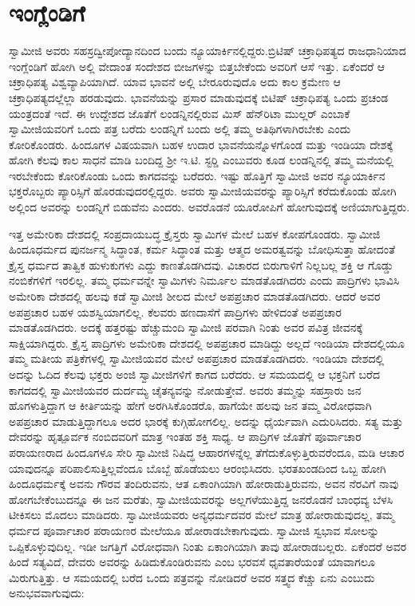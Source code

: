 
\chapter{ಇಂಗ್ಲೆಂಡಿಗೆ}

 ಸ್ವಾಮೀಜಿ ಅವರು ಸಹಸ್ರದ್ವೀಪೋದ್ಯಾನದಿಂದ ಬಂದು ನ್ಯೂಯಾರ್ಕಿನಲ್ಲಿದ್ದರು.\break ಬ್ರಿಟಿಷ್ ಚಕ್ರಾಧಿಪತ್ಯದ ರಾಜಧಾನಿಯಾದ ಇಂಗ್ಲೆಂಡಿಗೆ ಹೋಗಿ ಅಲ್ಲಿ ವೇದಾಂತ ಸಂದೇಶದ ಬೀಜಗಳನ್ನು ಬಿತ್ತಬೇಕೆಂದು ಅವರಿಗೆ ಆಸೆ ಇತ್ತು. ಏಕೆಂದರೆ ಆ ಚಕ್ರಾಧಿಪತ್ಯ ವಿಶ್ವವ್ಯಾಪಿಯಾಗಿದೆ. ಯಾವ ಭಾವನೆ ಅಲ್ಲಿ ಬೇರೂರುವುದೊ ಅದು ಕಾಲ ಕ್ರಮೇಣ ಆ ಚಕ್ರಾಧಿಪತ್ಯದಲ್ಲೆಲ್ಲಾ ಹರಡುವುದು. ಭಾವನೆಯನ್ನು ಪ್ರಸಾರ ಮಾಡುವುದಕ್ಕೆ ಬಿಟಿಷ್ ಚಕ್ರಾಧಿಪತ್ಯ ಒಂದು ಪ್ರಚಂಡ ಯಂತ್ರದಂತೆ ಇದೆ. ಈ ಉದ್ದೇಶದ ಜೊತೆಗೆ ಲಂಡನ್ನಿನಲ್ಲಿರುವ ಮಿಸ್ ಹೆನ್‍ರಿಟಾ ಮುಲ್ಲರ್ ಎಂಬಾಕೆ ಸ್ವಾಮೀಜಿಯವರಿಗೆ ಒಂದು ಪತ್ರ ಬರೆದು ಲಂಡನ್ನಿಗೆ ಬಂದು ಅಲ್ಲಿ ತಮ್ಮ ಅತಿಥಿಗಳಾಗಿರಬೇಕು ಎಂದು ಕೋರಿಕೊಂಡರು. ಹಿಂದೂಗಳ ವಿಷಯವಾಗಿ ಬಹಳ ಉದಾರ ಭಾವನೆಯನ್ನೊಳಗೊಂಡ ಮತ್ತು ಇಂಡಿಯಾ ದೇಶಕ್ಕೆ ಹೋಗಿ ಕೆಲವು ಕಾಲ ಸಾಧನೆ ಮಾಡಿ ಬಂದಿದ್ದ ಶ‍್ರೀ ಇ.ಟಿ. ಸ್ಟರ‍್ಡಿ ಎಂಬುವರು ಕೂಡ ಲಂಡನ್ನಿನಲ್ಲಿ ತಮ್ಮ ಮನೆಯಲ್ಲಿ ಇರಬೇಕೆಂದು ಕೋರಿಕೊಂಡು ಒಂದು ಕಾಗದವನ್ನು ಬರೆದರು. ಇಷ್ಟು ಹೊತ್ತಿಗೆ ಸ್ವಾಮೀಜಿ ಅವರ ನ್ಯೂಯಾರ್ಕಿನ ಭಕ್ತರೊಬ್ಬರು ಪ್ಯಾರಿಸ್ಸಿಗೆ ಹೊರಡುವುದರಲ್ಲಿದ್ದರು. ಅವರು ಸ್ವಾಮೀಜಿಯವರನ್ನು ಪ್ಯಾರಿಸ್ಸಿಗೆ ಕರೆದುಕೊಂಡು ಹೋಗಿ ಅಲ್ಲಿಂದ ಅವರನ್ನು ಲಂಡನ್ನಿಗೆ ಬಿಡುವೆನು ಎಂದರು. ಅವರೊಡನೆ ಯೂರೋಪಿಗೆ ಹೋಗುವುದಕ್ಕೆ ಅಣಿಯಾಗುತ್ತಿದ್ದರು. 

 ಇತ್ತ ಅಮೇರಿಕಾ ದೇಶದಲ್ಲಿ ಸಂಪ್ರದಾಯಬದ್ಧ ಕ್ರೈಸ್ತರು ಸ್ವಾಮಿಗಳ ಮೇಲೆ ಬಹಳ ಕೋಪಗೊಂಡರು. ಸ್ವಾಮೀಜಿ ಹಿಂದೂಧರ್ಮದ ಪುನರ್ಜನ್ಮ ಸಿದ್ಧಾಂತ, ಕರ್ಮ ಸಿದ್ಧಾಂತ ಮತ್ತು ಆತ್ಮದ ಅಮರತ್ವವನ್ನು ಬೋಧಿಸುತ್ತಾ ಹೋದಂತೆ ಕ್ರೈಸ್ತ ಧರ್ಮದ ತಾತ್ವಿಕ ಹುಳುಕುಗಳು ಎದ್ದು ಕಾಣತೊಡಗಿದವು. ವಿಚಾರದ ಬಿರುಗಾಳಿಗೆ ನಿಲ್ಲಬಲ್ಲ ಶಕ್ತಿ ಆ ಗೊಡ್ಡು ನಂಬಿಕೆಗಳಿಗೆ ಇರಲಿಲ್ಲ. ತಮ್ಮ ಧರ್ಮವನ್ನೇ ಸ್ವಾಮಿಗಳು ನಿರ್ಮೂಲ ಮಾಡತೊಡಗಿದರು ಎಂದು ಪಾದ್ರಿಗಳು ಭಾವಿಸಿ ಅಮೇರಿಕಾ ದೇಶದಲ್ಲಿ ಹಲವು ಕಡೆ ಸ್ವಾಮೀಜಿ ಶೀಲದ ಮೇಲೆ ಅಪಪ್ರಚಾರ ಮಾಡತೊಡಗಿದರು. ಆದರೆ ಅವರ ಅಪಪ್ರಚಾರ ಬಹಳ ಯಶಸ್ವಿಯಾಗಲಿಲ್ಲ. ಕೆಲವರು ಹಣದಾಸೆಗೆ ಪಾದ್ರಿಗಳು ಹೇಳಿದಂತೆ ಅಪಪ್ರಚಾರ ಮಾಡತೊಡಗಿದರು. ಅದಕ್ಕೆ ಹತ್ತರಷ್ಟು ಹೆಚ್ಚುಮಂದಿ ಸ್ವಾಮೀಜಿ ಪರವಾಗಿ ನಿಂತು ಅವರ ಪವಿತ್ರ ಜೀವನಕ್ಕೆ ಸಾಕ್ಷಿಯಾಗಿದ್ದರು. ಕ್ರೈಸ್ತ ಪಾದ್ರಿಗಳು ಅಮೇರಿಕಾ ದೇಶದಲ್ಲಿ ಅಪಪ್ರಚಾರ ಮಾಡಿದ್ದು ಅಲ್ಲದೆ ಇಂಡಿಯಾ ದೇಶದಲ್ಲಿಯೂ ತಮ್ಮ ಮತೀಯ ಪತ್ರಿಕೆಗಳಲ್ಲಿ ಸ್ವಾಮೀಜಿಯವರ ಮೇಲೆ ಅಪಪ್ರಚಾರ ಮಾಡತೊಡಗಿದರು. ಇಂಡಿಯಾ ದೇಶದಲ್ಲಿ ಅದನ್ನು ಓದಿದ ಕೆಲವು ಭಕ್ತರು ಅಂಜಿ ಸ್ವಾಮೀಜಿಗಳಿಗೆ ಕಾಗದ ಬರೆದರು. ಆ ಸಮಯದಲ್ಲಿ ಆ ಭಕ್ತನಿಗೆ ಬರೆದ ಕಾಗದದಲ್ಲಿ ಸ್ವಾಮೀಜಿಯವರ ದುರ್ದಮ್ಯ ಚೈತನ್ಯವನ್ನು ನೋಡುತ್ತೇವೆ. ಅವರು ತಮ್ಮನ್ನು ಸಹಸ್ರಾರು ಜನ ಹೊಗಳುತ್ತಿದ್ದಾಗ ಆ ಕೀರ್ತಿಯನ್ನು ಹೇಗೆ ಅರಗಿಸಿಕೊಂಡರೊ, ಹಾಗೆಯೇ ಹಲವು ಜನ ತಮ್ಮ ವಿರೋಧವಾಗಿ ಅಪಪ್ರಚಾರ ಮಾಡುತ್ತಿದ್ದಾಗಲೂ ಅದರ ಭಾರಕ್ಕೆ ಕುಗ್ಗಿಹೋಗಲಿಲ್ಲ. ಅದನ್ನು ಧೈರ್ಯವಾಗಿ ಎದುರಿಸಿದರು. ಸತ್ಯ ಮತ್ತು ದೇವರನ್ನು ಹೃತ್ಪೂರ್ವಕ ನಂಬಿದವರಿಗೆ ಮಾತ್ರ ಇಂತಹ ಶಕ್ತಿ ಸಾಧ್ಯ. ಆ ಪಾದ್ರಿಗಳ ಜೊತೆಗೆ ಪೂರ್ವಾಚಾರ ಪರಾಯಣರಾದ ಹಿಂದೂಗಳೂ ಸೇರಿ ಸ್ವಾಮೀಜಿ ನಿಷಿದ್ಧ ಆಹಾರಗಳನ್ನೆಲ್ಲ ತೆಗೆದುಕೊಳ್ಳುತ್ತಿರುವರೆಂದೂ, ಮಡಿ ಆಚಾರ ಯಾವುದನ್ನೂ ಪರಿಪಾಲಿಸುತ್ತಿಲ್ಲವೆಂದೂ ಬೊಬ್ಬೆ ಹೊಡೆಯಲು ಆರಂಭಿಸಿದರು. ಭರತಖಂಡದಿಂದ ಒಬ್ಬ ಹೋಗಿ ಹಿಂದೂಧರ್ಮಕ್ಕೆ ಅವನು ಗೌರವ ತಂದಿರುವನು, ಆತ ಏಕಾಂಗಿಯಾಗಿ ಹೋರಾಡುತ್ತಿರುವನು, ಅವನ ನೆರವಿಗೆ ನಾವು ಹೋಗಬೇಕೆಂಬುದನ್ನೂ ಈ ಜನ ಮರೆತು, ಸ್ವಾಮೀಜಿಯವರನ್ನು ಅಲ್ಲಗಳೆಯುತ್ತಿದ್ದ ಜನರೊಡನೆ ಬಾಂಧವ್ಯ ಬೆಳಸಿ ಟೀಕಿಸಲು ಮೊದಲು ಮಾಡಿದರು. ಸ್ವಾಮೀಜಿಯವರು ಅನ್ಯಧರ್ಮದವರ ಮೇಲೆ ಮಾತ್ರ ಹೋರಾಡುವುದಲ್ಲ, ತಮ್ಮ ಧರ್ಮದ ಪೂರ್ವಾಚಾರ ಪರಾಯಣರ ಮೇಲೆಯೂ ಹೋರಾಡಬೇಕಾಗುವುದು. ಸ್ವಾಮೀಜಿ ಸ್ವಭಾವ ಸೋಲನ್ನು ಒಪ್ಪಿಕೊಳ್ಳುವುದಿಲ್ಲ. ಇಡೀ ಜಗತ್ತಿಗೆ ವಿರೋಧವಾಗಿ ನಿಂತು ಏಕಾಂಗಿಯಾಗಿ ತಾವು ಹೋರಾಡಬಲ್ಲರು. ಏಕೆಂದರೆ ಅವರ ಹಿಂದೆ ಸತ್ಯವಿದೆ, ದೇವರು ಅವರನ್ನು ಹಿಡಿದುಕೊಂಡಿರುವನು ಎಂಬ ಭರವಸೆ ಧೃವತಾರೆಯಂತೆ ಯಾವಾಗಲೂ ಮಿರುಗುತ್ತಿತ್ತು. ಆ ಸಮಯದಲ್ಲಿ ಬರೆದ ಒಂದು ಪತ್ರವನ್ನು ನೋಡಿದರೆ ಅವರ ಸತ್ತ್ವದ ಕೆಚ್ಚು ಏನು ಎಂಬುದು ಅನುಭವವಾಗುವುದು: 

